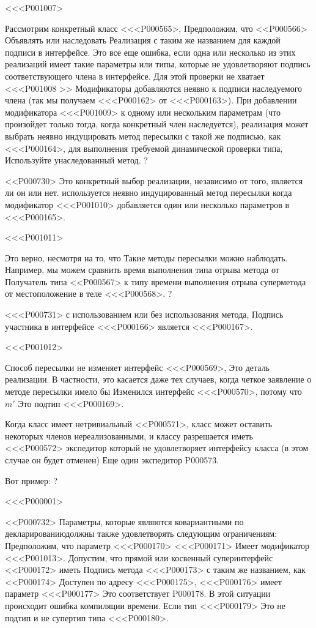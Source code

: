 {{{{{{{{{{{{{{{<<<P001007>{%
Рассмотрим конкретный класс <<<P000565>,
Предположим, что <<P000566> Объявлять или наследовать
Реализация с таким же названием
для каждой подписи в интерфейсе.
Это все еще ошибка, если одна или несколько из этих реализаций
имеет такие параметры или типы, которые не удовлетворяют
подпись соответствующего члена в интерфейсе.
Для этой проверки не хватает <<<P001008 >> Модификаторы добавляются неявно
к подписи наследуемого члена (так мы получаем <<<P000162> от <<<P000163>).
При добавлении модификатора <<<P001009>{} к одному или нескольким параметрам
(что произойдет только тогда, когда конкретный член наследуется),
реализация может выбрать неявно индуцировать метод пересылки
с такой же подписью, как <<<P000164>,
для выполнения требуемой динамической проверки типа,
Используйте унаследованный метод.%
?

<<P000730>%
Это конкретный выбор реализации, независимо от того, является ли он или нет.
используется неявно индуцированный метод пересылки
когда модификатор <<<P001010>{} добавляется
один или несколько параметров в <<<P000165>.

<<<P001011>{%
Это верно, несмотря на то, что
Такие методы пересылки можно наблюдать.
Например, мы можем сравнить
время выполнения типа отрыва метода от
Получатель типа <<P000567>
к типу времени выполнения отрыва суперметода от
местоположение в теле <<<P000568>.%
?

<<<P000731>%
с использованием или без использования метода,
Подпись участника в интерфейсе <<<P000166> является <<<P000167>.

<<<P001012>{%
Способ пересылки не изменяет интерфейс <<<P000569>,
Это деталь реализации.
В частности, это касается даже тех случаев, когда
четкое заявление о методе пересылки имело бы
Изменился интерфейс <<<P000570>, потому что $m'$ Это подтип <<<P000169>.

Когда класс имеет нетривиальный <<P000571>,
класс может оставить некоторых членов нереализованными,
и классу разрешается иметь <<<P000572> экспедитор
который не удовлетворяет интерфейсу класса
(в этом случае он будет отменен)
Еще один экспедитор P000573.

Вот пример: %
?

<<<P000001>

<<P000732>%
Параметры, которые являются ковариантными по декларированиюдолжны также удовлетворять следующим ограничениям:
Предположим, что параметр <<<P000170> <<<P000171> Имеет модификатор <<<P001013>.
Допустим, что прямой или косвенный суперинтерфейс <<P000172> иметь
Подпись метода <<<P000173> с таким же названием, как <<P000174> Доступен по адресу <<<P000175>,
<<<P000176> имеет параметр <<<P000177> Это соответствует P000178.
В этой ситуации происходит ошибка компиляции времени.
Если тип <<<P000179> Это не подтип и не супертип типа <<<P000180>.

}}}}}}}}}}}}}}}}}}
